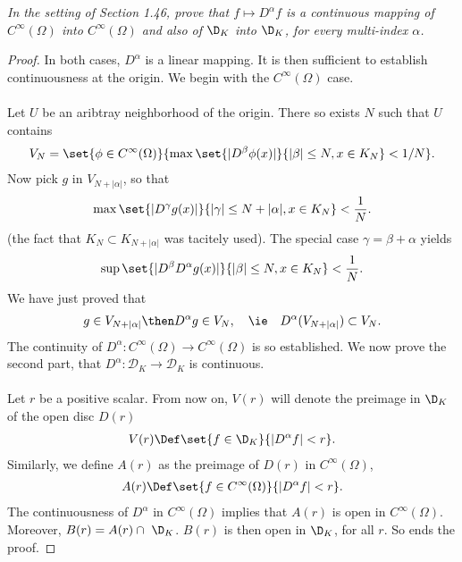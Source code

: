 \textit{In the setting of Section 1.46, prove that 
    $f \mapsto D^{\alpha}f$ 
is a continuous mapping of 
%
  $C^{\infty}(\Omega)$ into 
  $C^{\infty}(\Omega)$ and also of 
  $\D_{K}$ into 
  $\D_{K}$, for every multi-index $\alpha$.
%
}
\begin{proof} 
In both cases, $D^\alpha$ is a linear mapping. 
It is then sufficient to establish continuousness at the origin.
%
We begin with the $C^\infty(\Omega)$ case. \\
\\
Let $U$ be an aribtray neighborhood of the origin.
There so exists $N$ such that $U$ contains
%
  \begin{align} 
    V_{N}= \set{
      \phi \in C^\infty(\Omega)
    }{
      \max
      \set{
        | D^\beta\phi(x) |
      }{
        | \beta | \leq N, x\in K_N
      }
    < 1/N
    }.
  \end{align}
%
Now pick $g$ in $V_{N+|\alpha|}$, so that
%
  \begin{align}
    \max
    \set{
      | D^\gamma g(x) |
    }{
      | \gamma | \leq N+| \alpha |, 
      x\in K_{N}
    }
    < \frac{1}{N}.
  \end{align}
%
(the fact that $K_N\subset K_{N+|\alpha|}$ was tacitely used).
%
The special case $\gamma = \beta + \alpha$ yields
\begin{align}
    \sup
    \set{
      | D^\beta D^\alpha g(x) |
    }{
      | \beta | \leq N, 
      x\in K_{N}
    }
    < \frac{1}{N}.
  \end{align}
%
We have just proved that
%
  \begin{align}
    g \in V_{N + | \alpha|}
      \then 
    D^\alpha g \in V_{N},
      \quad
      \ie
      \quad
    D^\alpha (V_{N+|\alpha|}) \subset V_N.
  \end{align}
%
The continuity of 
  $D^{\alpha}: C^\infty (\Omega) \to C^\infty (\Omega)$ 
is so established.
%
We now prove the second part, \ie 
that $D^\alpha: \mathscr{D}_K \to \mathscr{D}_K$ is continuous. \\
\\
%
Let $r$ be a positive scalar. From now on, $V(r)$ will denote the 
preimage in $\D_K$ of the open disc $D(r)$  \ie 
%
\begin{align}
  V(r) \Def \set{f \in \D_K}{| D^\alpha f | < r}.
\end{align}
%
Similarly, we define $A(r)$ as the preimage of $D(r)$ in $C^\infty(\Omega)$, 
\ie 
%
\begin{align}
  A(r) \Def \set{f \in C^\infty (\Omega)}{| D^\alpha f | < r }.
\end{align}
%
The continuousness of 
%
  $D^\alpha$ in $C^\infty(\Omega)$ 
%
implies that $A(r)$ is open in $C^\infty(\Omega)$. Moreover, 
%
  $B(r) = A(r) \cap \ \D_K$. 
%
$B(r)$ is then open in $\D_K$, for all $r$. So ends the proof.
\end{proof}
